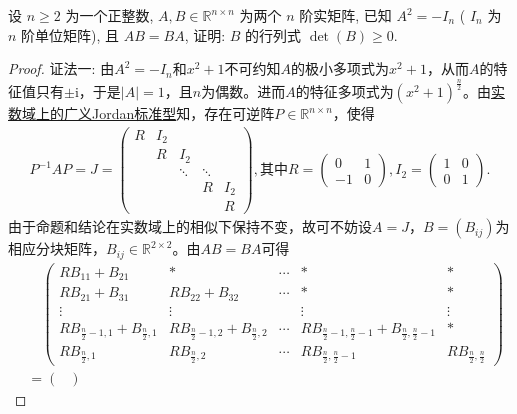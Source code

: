 \documentclass[../../main.tex]{subfiles}%
\begin{document}
\begin{example}
设 \( n \geqslant 2 \) 为一个正整数, \( A,B \in \mathbb{R}^{n \times n} \) 为两个 \( n \) 阶实矩阵, 已知 \( A^2 = -I_n \) ( \( I_n \) 为 \( n \) 阶单位矩阵), 且 \( AB = BA \), 证明: \( B \) 的行列式 \( \det(B) \geqslant 0 \).
\end{example}
\begin{proof}

{\color{blue} 证法一:} 由\(A^2 = -I_n\)和\(x^2 + 1\)不可约知\(A\)的极小多项式为\(x^2 + 1\)，从而\(A\)的特征值只有\(\pm \mathrm{i}\)，于是\(|A| = 1\)，且\(n\)为偶数。进而\(A\)的特征多项式为\((x^2 + 1)^{\frac{n}{2}}\)。由\hyperref[theorem:实数域上的广义Jordan标准型]{实数域上的广义Jordan标准型}知，存在可逆阵\(P \in \mathbb{R}^{n \times n}\)，使得
\begin{align*}
P^{-1}AP = J = \begin{pmatrix}
R & I_2 &  &  &  \\
 & R & I_2 &  &  \\
 &  & \ddots & \ddots &  \\
 &  &  & R & I_2 \\
 &  &  &  & R
\end{pmatrix},\text{其中}R = \begin{pmatrix} 0 & 1 \\ -1 & 0 \end{pmatrix},I_2 = \begin{pmatrix} 1 & 0 \\ 0 & 1 \end{pmatrix}.
\end{align*}
由于命题和结论在实数域上的相似下保持不变，故可不妨设\(A = J\)，\(B = (B_{ij})\)为相应分块矩阵，\(B_{ij} \in \mathbb{R}^{2 \times 2}\)。由\(AB = BA\)可得
\begin{align}
&\quad \begin{pmatrix}
RB_{11} + B_{21} & * & \cdots & * & * \\
RB_{21} + B_{31} & RB_{22} + B_{32} & \cdots & * & * \\
\vdots & \vdots &  & \vdots & \vdots \\
RB_{\frac{n}{2}-1,1} + B_{\frac{n}{2},1} & RB_{\frac{n}{2}-1,2} + B_{\frac{n}{2},2} & \cdots & RB_{\frac{n}{2}-1,\frac{n}{2}-1} + B_{\frac{n}{2},\frac{n}{2}-1} & * \\
RB_{\frac{n}{2},1} & RB_{\frac{n}{2},2} & \cdots & RB_{\frac{n}{2},\frac{n}{2}-1} & RB_{\frac{n}{2},\frac{n}{2}}
\end{pmatrix}
\nonumber \\
&= \begin{pmatrix}

\end{pmatrix}
\end{align}
\end{proof}
\end{document}

